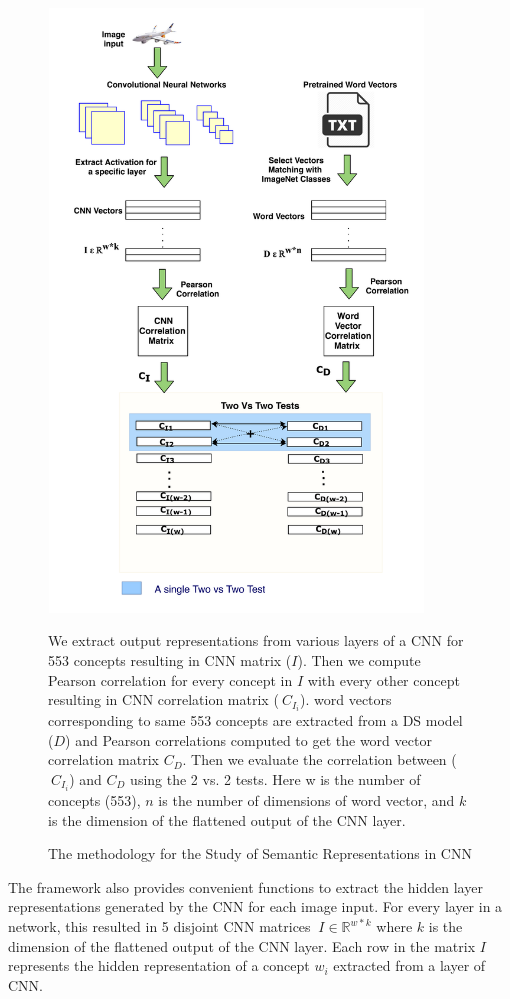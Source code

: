 \begin{figure}[!hb]
\centering
\includegraphics[width=10cm, height=16cm]{Figures/TwoVsTwoCNN}
\caption{The methodology for the Study of Semantic Representations in CNN}
\label{CNNSemanticsMethod}
We extract output representations from various layers of a CNN for 553 concepts resulting in CNN matrix ($I$). Then we compute Pearson correlation for every concept in $I$ with every other concept resulting in CNN correlation matrix ($\ C_{I_i}$). word vectors corresponding to same 553 concepts are extracted from a DS model ($D$) and Pearson correlations computed to get the word vector correlation matrix $C_D$. Then we evaluate the correlation between ($\ C_{I_i}$) and $C_D$ using the 2 vs. 2 tests. Here w is the number of concepts (553), $n$ is the number of dimensions of word vector, and $k$ is the dimension of the flattened output of the CNN layer.
\end{figure}

The framework also provides convenient functions to extract the hidden layer representations generated by the CNN for each image input. For every layer in a network, this resulted in 5 disjoint CNN matrices $\ I\in \mathbb{R} ^{w*k}$ where $k$ is the dimension of the flattened output of the CNN layer. Each row in the matrix $I$ represents the hidden representation of a concept $w_i$ extracted from a layer of CNN. 



